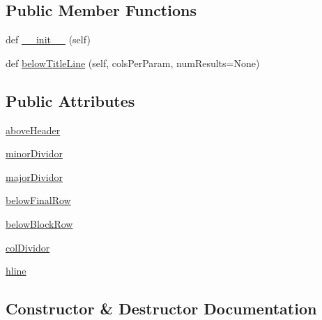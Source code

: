 \subsection*{Public Member Functions}
\begin{DoxyCompactItemize}
\item 
def \mbox{\hyperlink{classgetdist_1_1types_1_1NoLineTableFormatter_a7aec9e7deb15471079e13edb87866028}{\+\_\+\+\_\+init\+\_\+\+\_\+}} (self)
\item 
def \mbox{\hyperlink{classgetdist_1_1types_1_1NoLineTableFormatter_a4599ec3519a11f9fd4f254abf1e0e62b}{below\+Title\+Line}} (self, cols\+Per\+Param, num\+Results=None)
\end{DoxyCompactItemize}
\subsection*{Public Attributes}
\begin{DoxyCompactItemize}
\item 
\mbox{\hyperlink{classgetdist_1_1types_1_1NoLineTableFormatter_a0d8f2d57f6e7d063b3257e8305047276}{above\+Header}}
\item 
\mbox{\hyperlink{classgetdist_1_1types_1_1NoLineTableFormatter_a5f8f3d6fb37468d344d7e0346741a4c5}{minor\+Dividor}}
\item 
\mbox{\hyperlink{classgetdist_1_1types_1_1NoLineTableFormatter_a3821b906f33f3890b928f7210157e9eb}{major\+Dividor}}
\item 
\mbox{\hyperlink{classgetdist_1_1types_1_1NoLineTableFormatter_ad7c9b5339331f0a45aab0a4efdda806a}{below\+Final\+Row}}
\item 
\mbox{\hyperlink{classgetdist_1_1types_1_1NoLineTableFormatter_ab174a82bcf439180920e1740b8eb58f8}{below\+Block\+Row}}
\item 
\mbox{\hyperlink{classgetdist_1_1types_1_1NoLineTableFormatter_aee55427ea38ee8413140c372bdc2766e}{col\+Dividor}}
\item 
\mbox{\hyperlink{classgetdist_1_1types_1_1NoLineTableFormatter_af698acd022799d428f61a3c74396eee9}{hline}}
\end{DoxyCompactItemize}


\subsection{Constructor \& Destructor Documentation}
\mbox{\label{classgetdist_1_1types_1_1NoLineTableFormatter_a7aec9e7deb15471079e13edb87866028}} 
